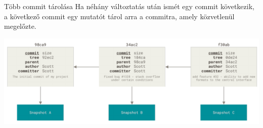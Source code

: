 \documentclass[english, aspectratio=169]{beamer}
\begin{document}
\begin{frame}{Több commit tárolása}
Ha néhány változtatás után ismét egy commit következik, a következő commit egy mutatót tárol arra a commitra, amely közvetlenül megelőzte.\\
\begin{center}
\includegraphics[width=14cm, keepaspectratio]{images/git_5.png}
\end{center}
\end{frame}
\end{document}
